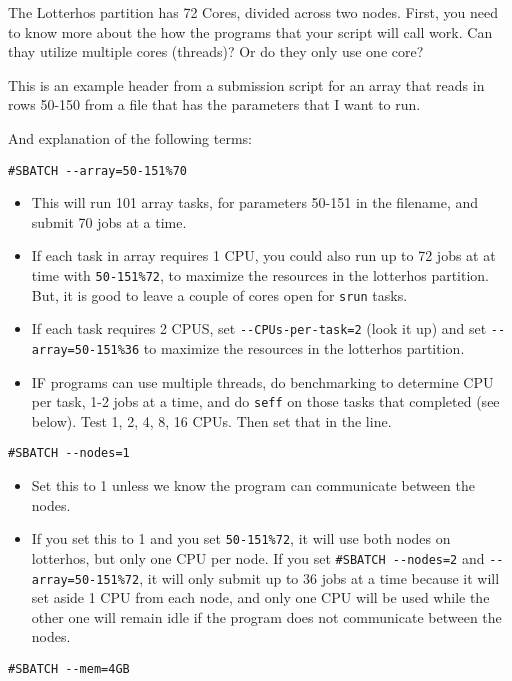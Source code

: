 \documentclass[
  letterpaper,
  DIV=11,
  numbers=noendperiod]{scrreprt}
\begin{document}
The Lotterhos partition has 72 Cores, divided across two nodes. First,
you need to know more about the how the programs that your script will
call work. Can thay utilize multiple cores (threads)? Or do they only
use one core?

This is an example header from a submission script for an array that
reads in rows 50-150 from a file that has the parameters that I want to
run.

And explanation of the following terms:

\texttt{\#SBATCH\ -\/-array=50-151\%70}

\begin{itemize}
\item
  This will run 101 array tasks, for parameters 50-151 in the filename,
  and submit 70 jobs at a time.
\item
  If each task in array requires 1 CPU, you could also run up to 72 jobs
  at at time with \texttt{50-151\%72}, to maximize the resources in the
  lotterhos partition. But, it is good to leave a couple of cores open
  for \texttt{srun} tasks.
\item
  If each task requires 2 CPUS, set \texttt{-\/-CPUs-per-task=2} (look
  it up) and set \texttt{-\/-array=50-151\%36} to maximize the resources
  in the lotterhos partition.
\item
  IF programs can use multiple threads, do benchmarking to determine CPU
  per task, 1-2 jobs at a time, and do \texttt{seff} on those tasks that
  completed (see below). Test 1, 2, 4, 8, 16 CPUs. Then set that in the
  line.
\end{itemize}

\texttt{\#SBATCH\ -\/-nodes=1}

\begin{itemize}
\item
  Set this to 1 unless we know the program can communicate between the
  nodes.
\item
  If you set this to 1 and you set \texttt{50-151\%72}, it will use both
  nodes on lotterhos, but only one CPU per node. If you set
  \texttt{\#SBATCH\ -\/-nodes=2} and \texttt{-\/-array=50-151\%72}, it
  will only submit up to 36 jobs at a time because it will set aside 1
  CPU from each node, and only one CPU will be used while the other one
  will remain idle if the program does not communicate between the
  nodes.
\end{itemize}

\texttt{\#SBATCH\ -\/-mem=4GB}
\end{document}
